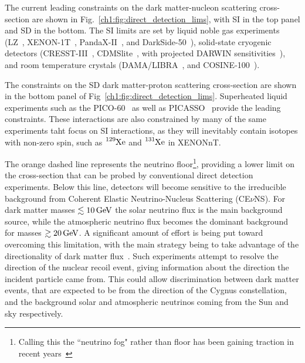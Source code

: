 The current leading constraints on the dark matter-nucleon scattering cross-section
are shown in Fig.~\ref{ch1:fig:direct_detection_lims}, with SI in the top panel and SD in the bottom.
The SI limits are set by liquid noble gas experiments (LZ~\cite{LZ:2022lsv_jul_FirstDarkMatter}, 
XENON-1T~\cite{XENON:2020gfr_mar_SearchCoherentElastic}, PandaX-II~\cite{PandaX-4T:2021bab_dec_DarkMatterSearch},
and DarkSide-50~\cite{DarkSide:2022dhx_mar_SearchDarkMatterNucleon}), solid-state cryogenic detectors (CRESST-III~\cite{CRESST:2019jnq_nov_FirstresultsCRESSTIII}, CDMSlite~\cite{SuperCDMS:2023sql_jun_SearchLowmassDark}, with projected DARWIN sensitivities~\cite{Aalbers:2022dzr_dec_Nextgenerationliquidxenon}), 
and room temperature crystals (DAMA/LIBRA~\cite{Savage:2008er_CompatibilityDAMALIBRA}, and COSINE-100~\cite{COSINE-100:2021xqn_nov_StrongconstraintsCOSINE100}). 

The constraints on the SD dark matter-proton scattering cross-section are shown in the bottom panel of Fig~\ref{ch1:fig:direct_detection_lims}. 
Superheated liquid experiments such as the PICO-60~\cite{PICO:2019vsc_jul_Darkmattersearch} as well as PICASSO~\cite*{Behnke:2016lsk_apr_FinalResultsPICASSO} provide the leading constraints. 
These interactions are also constrained by many of the same experiments taht focus on SI interactions, as they will inevitably contain isotopes with non-zero spin, such as $\ce{^{129} Xe}$ and $\ce{^{131} Xe}$ in XENONnT. 

The orange dashed line represents the neutrino floor\footnote{Calling this the ``neutrino fog" rather than floor has been gaining traction in recent years~\cite{OHare:2021utq_dec_Foghorizonnew}}, providing a lower limit on the cross-section that can be probed by conventional direct detection experiments. Below this line, detectors will become sensitive to the irreducible background from Coherent Elastic Neutrino-Nucleus Scattering (CE$\nu$NS). For dark matter masses $\lesssim 10{\rm \,GeV}$ the solar neutrino flux is the main background source, while the atmospheric neutrino flux becomes the dominant background for masses $\gtrsim 20{\rm \,GeV}$. 
A significant amount of effort is being put toward overcoming this limitation, with the main strategy being to take advantage of the directionality of dark matter flux~\cite{Grothaus:2014hja_jun_DirectionalDarkMatter}. Such experiments attempt to resolve the direction of the nuclear recoil event, giving information about the direction the incident particle came from. This could allow discrimination between dark matter events, that are expected to be from the direction of the Cygnus constellation, and the background solar and atmospheric neutrinos coming from the Sun and sky respectively. 

